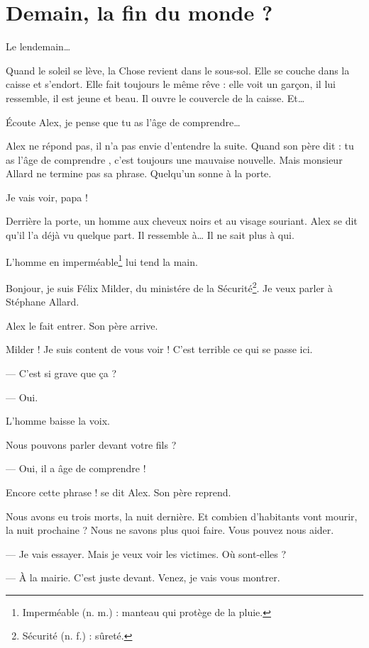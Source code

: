 \chapter{Demain, la fin du monde ?}
Le lendemain\ldots{}

Quand le soleil se lève, la Chose revient dans le sous-sol. Elle se couche dans la caisse et s'endort. Elle fait toujours le même
rêve : elle voit un gar\c{c}on, il lui ressemble, il est jeune et beau. Il ouvre le couvercle de la caisse. Et\ldots{}

\og Écoute Alex, je pense que tu as l'âge de comprendre\ldots{} \fg{}

Alex ne répond pas, il n'a pas envie d'entendre la suite. Quand son père dit : \og tu as l'âge de comprendre \fg{}, c'est
toujours une mauvaise nouvelle. Mais monsieur Allard ne termine pas sa phrase. Quelqu'un sonne à la porte.

\og Je vais voir, papa ! \fg{}

Derrière la porte, un homme aux cheveux noirs et au visage souriant. Alex se dit qu'il l'a déjà vu quelque part. Il ressemble
à\ldots{} Il ne sait plus à qui.

L'homme en imperméable\footnote{Imperméable (n. m.) : manteau qui protège de la pluie.} lui tend la main.

\og Bonjour, je suis Félix Milder, du ministére de la Sécurité\footnote{Sécurité (n. f.) : sûreté.}. Je veux parler à Stéphane
Allard. \fg{}

Alex le fait entrer. Son père arrive.

\og Milder ! Je suis content de vous voir ! C'est terrible ce qui se passe ici.

--- C'est si grave que \c{c}a ?

--- Oui. \fg{}

L'homme baisse la voix.

\og Nous pouvons parler devant votre fils ?

--- Oui, il a âge de comprendre ! \fg{}

Encore cette phrase ! se dit Alex. Son père reprend.

\og Nous avons eu trois morts, la nuit dernière. Et combien d'habitants vont mourir, la nuit prochaine ? Nous ne savons plus quoi
faire. Vous pouvez nous aider.

--- Je vais essayer. Mais je veux voir les victimes. Où sont-elles ?

--- À la mairie. C'est juste devant. Venez, je vais vous montrer. \fg{}

